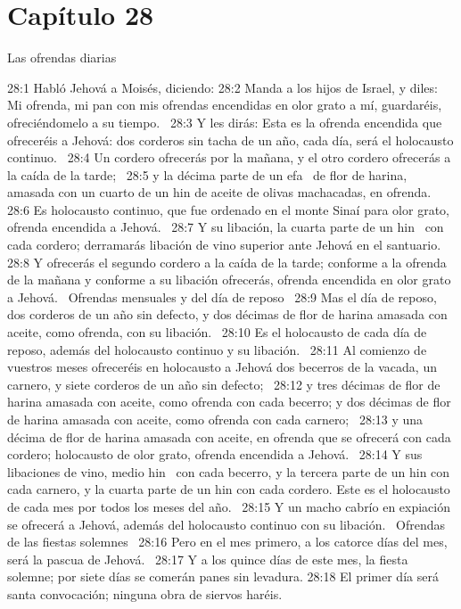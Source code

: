 \section*{Capítulo 28}
Las ofrendas diarias   

28:1 Habló Jehová a Moisés, diciendo: 
28:2 Manda a los hijos de Israel, y diles: Mi ofrenda, mi pan con mis ofrendas encendidas en olor grato a mí, guardaréis, ofreciéndomelo a su tiempo.  
28:3 Y les dirás: Esta es la ofrenda encendida que ofreceréis a Jehová: dos corderos sin tacha de un año, cada día, será el holocausto continuo.  
28:4 Un cordero ofrecerás por la mañana, y el otro cordero ofrecerás a la caída de la tarde;  
28:5 y la décima parte de un efa  de flor de harina, amasada con un cuarto de un hin de aceite de olivas machacadas, en ofrenda.  
28:6 Es holocausto continuo, que fue ordenado en el monte Sinaí para olor grato, ofrenda encendida a Jehová.  
28:7 Y su libación, la cuarta parte de un hin  con cada cordero; derramarás libación de vino superior ante Jehová en el santuario.  
28:8 Y ofrecerás el segundo cordero a la caída de la tarde; conforme a la ofrenda de la mañana y conforme a su libación ofrecerás, ofrenda encendida en olor grato a Jehová.  
Ofrendas mensuales y del día de reposo  
28:9 Mas el día de reposo, dos corderos de un año sin defecto, y dos décimas de flor de harina amasada con aceite, como ofrenda, con su libación.  
28:10 Es el holocausto de cada día de reposo, además del holocausto continuo y su libación.  
28:11 Al comienzo de vuestros meses ofreceréis en holocausto a Jehová dos becerros de la vacada, un carnero, y siete corderos de un año sin defecto;  
28:12 y tres décimas de flor de harina amasada con aceite, como ofrenda con cada becerro; y dos décimas de flor de harina amasada con aceite, como ofrenda con cada carnero;  
28:13 y una décima de flor de harina amasada con aceite, en ofrenda que se ofrecerá con cada cordero; holocausto de olor grato, ofrenda encendida a Jehová.  
28:14 Y sus libaciones de vino, medio hin  con cada becerro, y la tercera parte de un hin con cada carnero, y la cuarta parte de un hin con cada cordero. Este es el holocausto de cada mes por todos los meses del año.  
28:15 Y un macho cabrío en expiación se ofrecerá a Jehová, además del holocausto continuo con su libación.  
Ofrendas de las fiestas solemnes   
28:16 Pero en el mes primero, a los catorce días del mes, será la pascua de Jehová.  
28:17 Y a los quince días de este mes, la fiesta solemne; por siete días se comerán panes sin levadura. 
28:18 El primer día será santa convocación; ninguna obra de siervos haréis.  
